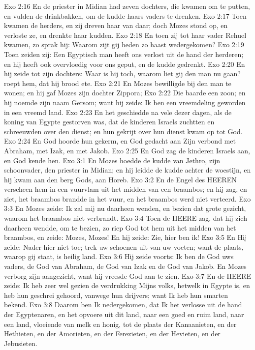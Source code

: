 Exo 2:16  En de priester in Midian had zeven dochters, die kwamen om te putten, en vulden de drinkbakken, om de kudde haars vaders te drenken.
Exo 2:17  Toen kwamen de herders, en zij dreven haar van daar; doch Mozes stond op, en verloste ze, en drenkte haar kudden.
Exo 2:18  En toen zij tot haar vader Rehuel kwamen, zo sprak hij: Waarom zijt gij heden zo haast wedergekomen?
Exo 2:19  Toen zeiden zij: Een Egyptisch man heeft ons verlost uit de hand der herderen; en hij heeft ook overvloedig voor ons geput, en de kudde gedrenkt.
Exo 2:20  En hij zeide tot zijn dochters: Waar is hij toch, waarom liet gij den man nu gaan? roept hem, dat hij brood ete.
Exo 2:21  En Mozes bewilligde bij den man te wonen; en hij gaf Mozes zijn dochter Zippora;
Exo 2:22  Die baarde een zoon; en hij noemde zijn naam Gersom; want hij zeide: Ik ben een vreemdeling geworden in een vreemd land.
Exo 2:23  En het geschiedde na vele dezer dagen, als de koning van Egypte gestorven was, dat de kinderen Israels zuchtten en schreeuwden over den dienst; en hun gekrijt over hun dienst kwam op tot God.
Exo 2:24  En God hoorde hun gekerm, en God gedacht aan Zijn verbond met Abraham, met Izak, en met Jakob.
Exo 2:25  En God zag de kinderen Israels aan, en God kende hen.
Exo 3:1  En Mozes hoedde de kudde van Jethro, zijn schoonvader, den priester in Midian; en hij leidde de kudde achter de woestijn, en hij kwam aan den berg Gods, aan Horeb.
Exo 3:2  En de Engel des HEEREN verscheen hem in een vuurvlam uit het midden van een braambos; en hij zag, en ziet, het braambos brandde in het vuur, en het braambos werd niet verteerd.
Exo 3:3  En Mozes zeide: Ik zal mij nu daarheen wenden, en bezien dat grote gezicht, waarom het braambos niet verbrandt.
Exo 3:4  Toen de HEERE zag, dat hij zich daarheen wendde, om te bezien, zo riep God tot hem uit het midden van het braambos, en zeide: Mozes, Mozes! En hij zeide: Zie, hier ben ik!
Exo 3:5  En Hij zeide: Nader hier niet toe; trek uw schoenen uit van uw voeten; want de plaats, waarop gij staat, is heilig land.
Exo 3:6  Hij zeide voorts: Ik ben de God uws vaders, de God van Abraham, de God van Izak en de God van Jakob. En Mozes verborg zijn aangezicht, want hij vreesde God aan te zien.
Exo 3:7  En de HEERE zeide: Ik heb zeer wel gezien de verdrukking Mijns volks, hetwelk in Egypte is, en heb hun geschrei gehoord, vanwege hun drijvers; want Ik heb hun smarten bekend.
Exo 3:8  Daarom ben Ik nedergekomen, dat Ik het verlosse uit de hand der Egyptenaren, en het opvoere uit dit land, naar een goed en ruim land, naar een land, vloeiende van melk en honig, tot de plaats der Kanaanieten, en der Hethieten, en der Amorieten, en der Ferezieten, en der Hevieten, en der Jebusieten.
